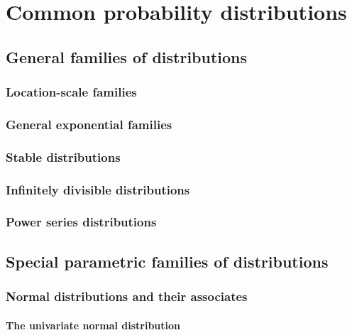 
\chapter{Common probability distributions\label{chap:probabilityDistributions}}

\section{General families of distributions}

\subsection{Location-scale families}

\subsection{General exponential families}

\subsection{Stable distributions}

\subsection{Infinitely divisible distributions}

\subsection{Power series distributions}

\section{Special parametric families of distributions}

\subsection{Normal distributions and their associates}

\subsubsection{The univariate normal distribution}

